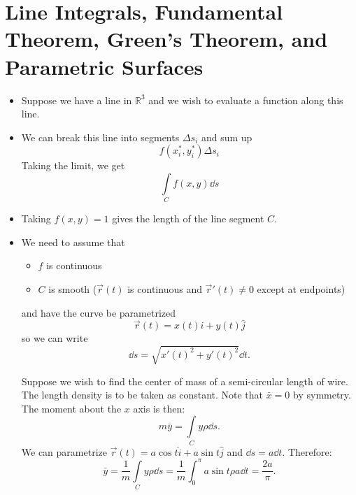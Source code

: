 \section{Line Integrals, Fundamental Theorem, Green's Theorem, and Parametric Surfaces}
\begin{itemize}
    \item Suppose we have a line in $\mathbb{R}^3$ and we wish to evaluate a function along this line.
    \item We can break this line into segments $\Delta s_i$ and sum up 
    \begin{equation}
        f(x_i^*,y_i^*)\Delta s_i
    \end{equation}
    Taking the limit, we get
    \begin{equation}
        \int\limits_C f(x,y) \dd{s}
    \end{equation}
    \item Taking $f(x,y)=1$ gives the length of the line segment $C$. 
    \item We need to assume that
    \begin{itemize}
        \item $f$ is continuous
        \item $C$ is smooth ($\vec{r}(t)$ is continuous and $\vec{r}'(t) \neq 0$ except at endpoints)
    \end{itemize}
    and have the curve be parametrized 
    \begin{equation}
        \vec{r}(t) = x(t)\hat{i}+y(t)\hat{j}
    \end{equation}
    so we can write 
    \begin{equation}
        \dd{s} = \sqrt{x'(t)^2 + y'(t)^2}\dd{t}.
    \end{equation}
    \begin{example}
        Suppose we wish to find the center of mass of a semi-circular length of wire. The length density is to be taken as constant. Note that $\bar{x}=0$ by symmetry. The moment about the $x$ axis is then: 
        \begin{equation}
            m\bar{y} = \int\limits_C y\rho \dd{s}.
        \end{equation}
        We can parametrize $\vec{r}(t) = a\cos t \hat{i} + a\sin t\hat{j}$ and $\dd{s} = a\dd{t}.$ Therefore: 
        \begin{equation}
            \bar{y} = \frac{1}{m}\int\limits_C y\rho \dd{s} = \frac{1}{m}\int_0^\pi a\sin t\rho a \dd{t} = \frac{2a}{\pi}.
        \end{equation}

\end{example}
\end{itemize}
